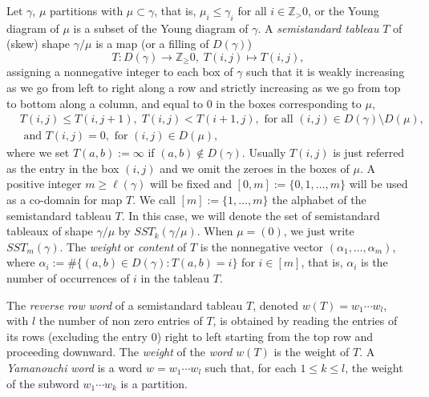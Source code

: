 \documentclass[reqno]{amsart}
\theoremstyle{tplain}
\begin{document}
{Let $\gamma$, $\mu$  partitions   with $\mu \subset \gamma$, that is,  $\mu_i\le  \gamma_i$ for all $ i\in\mathbb{Z}_>0 $, or the Young diagram of $\mu$ is a subset of
the Young diagram of $\gamma$. A \emph{semistandard
tableau} $T$ of (skew) shape $\gamma/\mu$ is a map (or a filling of $D(\gamma)$)
 $$T:D(\gamma)\rightarrow \mathbb{Z}_\ge0, \; T(i,j)\mapsto T(i,j),$$
assigning a nonnegative integer to each box of $\gamma$  such that it is weakly increasing as we go from left to right along a row and strictly
increasing as we go from top to bottom along a column, and equal to $0$  in the boxes corresponding to $\mu$,
\begin{align}&T(i,j)\le T(i,j+1),\; T(i,j)<T(i+1,j), \mbox{ for all $(i,j)\in D(\gamma)\setminus D(\mu)$,}\nonumber\\
&\mbox{ and }  T(i,j)=0, \mbox{ for $(i,j)\in  D(\mu)$,}
\nonumber
\end{align}
where we set $T(a,b):=\infty$ if $(a, b) \notin D(\gamma)$.
 Usually $T(i,j)$ is just referred as
the entry in the box $(i,j)$ and we omit the zeroes  in the boxes of $\mu$. A positive integer
$m\ge \ell(\gamma)$ will be fixed and $[0, m]:=\{0, 1, \dots, m\}$ will be used as a co-domain for map $T$. We call
$[m]:=\{1, \dots, m\}$ the alphabet of the semistandard tableau $T$.
 In this case, we will denote the set of semistandard tableaux of shape $\gamma/\mu$ by
$SST_k(\gamma/\mu)$. When $\mu=(0)$, we just write $SST_m(\gamma)$. The \emph{weight} or \emph{content} of $T$ is the nonnegative vector $(\alpha_1,\dots,  \alpha_m)$, where $\alpha_i:=\#\{(a,b)\in D(\gamma):T(a,b)=i\}$ for $i\in[m]$, that is, $\alpha_i$ is  the number of occurrences of $i$ in the tableau $T$.

The \emph{reverse} \emph{row} \emph{word} of a semistandard tableau
$T$, denoted $w(T)=w_1\cdots w_l$, with $l$ the number of non zero entries of $T$,  is obtained by reading the entries of its rows (excluding the entry 0) right to left
starting from the top row and proceeding downward. The \emph{weight} of the \emph{word}  $w(T)$ is the weight of $T$. A \emph{Yamanouchi} \emph{word} is a word $w =w_1 \cdots w_l$ such
that, for each $1 \le k \le l$,  the  weight of the subword  $w_1 \cdots w_k$ is a partition.

}
\end{document}
